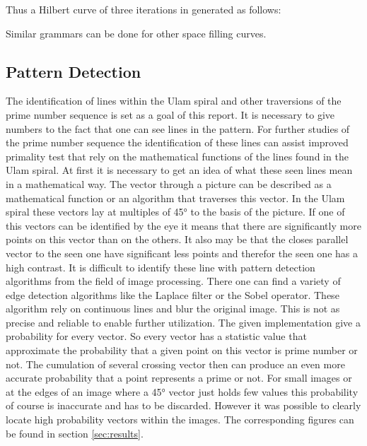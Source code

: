 Thus a Hilbert curve of three iterations in generated as follows:

Similar grammars can be done for other space filling curves.

\subsection{Pattern Detection}
\label{sec:pattern}
The identification of lines within the Ulam spiral and other traversions of the prime number sequence is set as a goal of this report. It is necessary to give numbers to the fact that one can see lines in the pattern. For further studies of the prime number sequence the identification of these lines can assist improved primality test that rely on the mathematical functions of the lines found in the Ulam spiral.
At first it is necessary to get an idea of what these seen lines mean in a mathematical way. The vector through a picture can be described as a mathematical function or an algorithm that traverses this vector. In the Ulam spiral these vectors lay at multiples of 45° to the basis of the picture.
If one of this vectors can be identified by the eye it means that there are significantly more points on this vector than on the others. It also may be that the closes parallel vector to the seen one have significant less points and therefor the seen one has a high contrast.
It is difficult to identify these line with pattern detection algorithms from the field of image processing. There one can find a variety of edge detection algorithms like the Laplace filter or the Sobel operator. These algorithm rely on continuous lines and blur the original image. This is not as precise and reliable to enable further utilization.
The given implementation give a probability for every vector. So every vector has a statistic value that approximate the probability that a given point on this vector is prime number or not. The cumulation of several crossing vector then can produce an even more accurate probability that a point represents a prime or not.
For small images or at the edges of an image where a 45° vector just holds few values this probability of course is inaccurate and has to be discarded. However it was possible to clearly locate high probability vectors within the images. The corresponding figures can be found in section \ref{sec:results}.


